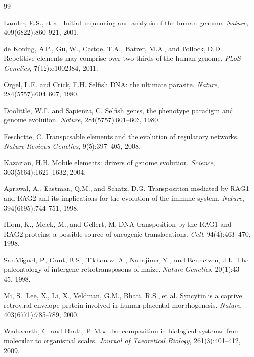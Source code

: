 \documentclass[12pt,a4paper]{article}
\begin{document}
\begin{thebibliography}{99}

Lander, E.S., et al.
\newblock Initial sequencing and analysis of the human genome.
\newblock \emph{Nature}, 409(6822):860--921, 2001.

de Koning, A.P., Gu, W., Castoe, T.A., Batzer, M.A., and Pollock, D.D.
\newblock Repetitive elements may comprise over two-thirds of the human genome.
\newblock \emph{PLoS Genetics}, 7(12):e1002384, 2011.

Orgel, L.E. and Crick, F.H.
\newblock Selfish DNA: the ultimate parasite.
\newblock \emph{Nature}, 284(5757):604--607, 1980.

Doolittle, W.F. and Sapienza, C.
\newblock Selfish genes, the phenotype paradigm and genome evolution.
\newblock \emph{Nature}, 284(5757):601--603, 1980.

Feschotte, C.
\newblock Transposable elements and the evolution of regulatory networks.
\newblock \emph{Nature Reviews Genetics}, 9(5):397--405, 2008.

Kazazian, H.H.
\newblock Mobile elements: drivers of genome evolution.
\newblock \emph{Science}, 303(5664):1626--1632, 2004.

Agrawal, A., Eastman, Q.M., and Schatz, D.G.
\newblock Transposition mediated by RAG1 and RAG2 and its implications for the
evolution of the immune system.
\newblock \emph{Nature}, 394(6695):744--751, 1998.

Hiom, K., Melek, M., and Gellert, M.
\newblock DNA transposition by the RAG1 and RAG2 proteins: a possible source
of oncogenic translocations.
\newblock \emph{Cell}, 94(4):463--470, 1998.

SanMiguel, P., Gaut, B.S., Tikhonov, A., Nakajima, Y., and Bennetzen, J.L.
\newblock The paleontology of intergene retrotransposons of maize.
\newblock \emph{Nature Genetics}, 20(1):43--45, 1998.

Mi, S., Lee, X., Li, X., Veldman, G.M., Bhatt, R.S., et al.
\newblock Syncytin is a captive retroviral envelope protein involved in human
placental morphogenesis.
\newblock \emph{Nature}, 403(6771):785--789, 2000.

Wadsworth, C. and Bhatt, P.
\newblock Modular composition in biological systems: from molecular to organismal scales.
\newblock \emph{Journal of Theoretical Biology}, 261(3):401--412, 2009.


\end{thebibliography}
\end{document}
